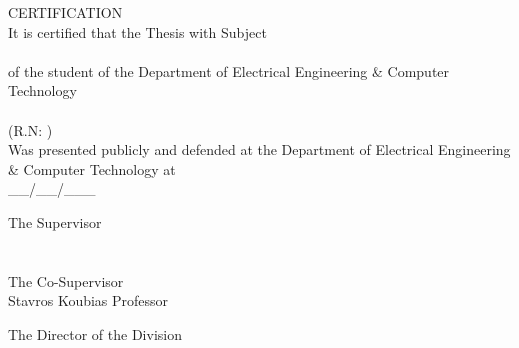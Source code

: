 \pagestyle{empty}
\begin{center}
{\LARGE CERTIFICATION\\[1cm]}
\large It is certified that the Thesis with Subject\\[1cm]
\textbf{\large \doctitle }\\[1cm]
of the student of the Department of Electrical Engineering \& Computer Technology\\[1.5cm]
\me \\[0.5cm]
(R.N: \studnum )\\[1.5cm]
Was presented publicly and defended at the Department of Electrical Engineering \& Computer Technology at\\[1cm]
\Large{\_\_/\_\_/\_\_\_}\\[1.5cm]
\end{center}
\begin{minipage}{0.5\textwidth}
\begin{flushleft} \large
The Supervisor\\[2cm]
\supname \\
\emph{\suptitle}\\[1cm]
The Co-Supervisor\\[2cm]
Stavros Koubias
\newline Professor

\end{flushleft}
\end{minipage}
\begin{minipage}{0.5\textwidth}
\begin{flushright} \large
The Director of the Division\\[4cm]
\headofdivision\\
\emph{\headofdivisiontitle}
\end{flushright}
\end{minipage}
